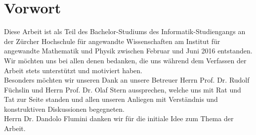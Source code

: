 %
%


\chapter{Vorwort}

  Diese Arbeit ist als Teil des Bachelor-Studiums des Informatik-Studiengangs
  an der Zürcher Hochschule für angewandte Wissenschaften am
  Institut für angewandte Mathematik und Physik zwischen Februar und Juni 2016 entstanden.
  \\
  Wir möchten uns bei allen denen bedanken, die uns während dem Verfassen der Arbeit
  stets unterstützt und motiviert haben.
  \\
  Besonders möchten wir unseren Dank an unsere Betreuer Herrn Prof. Dr. Rudolf Füchslin und
  Herrn Prof. Dr. Olaf Stern aussprechen, welche uns mit Rat und Tat zur Seite standen und allen
  unseren Anliegen mit Verständnis und konstruktiven Diskussionen begegneten.
  \\
  Herrn Dr. Dandolo Flumini danken wir für die initiale Idee zum Thema der Arbeit.

